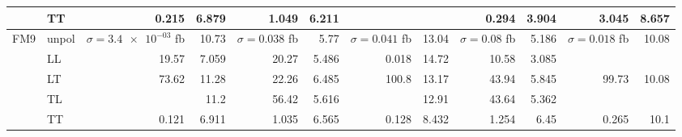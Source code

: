 \begin{table}[h]
{\begin{tabular}{llrrrrrrrrrr}
 & TT & \num{0.215} & \num{6.879} & \num{1.049} & \num{6.211} &  &  & \num{0.294} & \num{3.904} & \num{3.045} & \num{8.657} \\
\midrule
\multirow{5}{*}{FM9}
 & unpol & $\sigma = \num{3.4e-03}$ fb & \num{10.73} & $\sigma = \num{0.038}$ fb & \num{5.77} & $\sigma = \num{0.041}$ fb & \num{13.04} & $\sigma = \num{0.08}$ fb & \num{5.186} & $\sigma = \num{0.018}$ fb & \num{10.08} \\
 & LL & \num{19.57} & \num{7.059} & \num{20.27} & \num{5.486} & \num{0.018} & \num{14.72} & \num{10.58} & \num{3.085} &  &  \\
 & LT & \num{73.62} & \num{11.28} & \num{22.26} & \num{6.485} & \num{100.8} & \num{13.17} & \num{43.94} & \num{5.845} & \num{99.73} & \num{10.08} \\
 & TL &  & \num{11.2} & \num{56.42} & \num{5.616} &  & \num{12.91} & \num{43.64} & \num{5.362} &  &  \\
 & TT & \num{0.121} & \num{6.911} & \num{1.035} & \num{6.565} & \num{0.128} & \num{8.432} & \num{1.254} & \num{6.45} & \num{0.265} & \num{10.1} \\
\bottomrule
\end{tabular}
}%
\end{table}